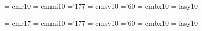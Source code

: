  \font\frtnrm  = cmr10     %
 \font\frtnmi  = cmmi10    %
    \skewchar\frtnmi ='177          %
 \font\frtnsy  = cmsy10    %
    \skewchar\frtnsy ='60           %
 \font\frtnbf  = cmbx10    %
 \font\frtnly  = lasy10   %
 
 \font\svtnrm  = cmr17                %
 \font\svtnmi  = cmmi10    %
    \skewchar\svtnmi ='177          %
 \font\svtnsy  = cmsy10    %
    \skewchar\svtnsy ='60           %
 \font\svtnbf  = cmbx10    %
 \font\svtnly  = lasy10   %
 
